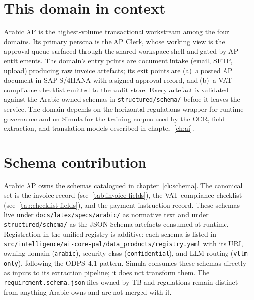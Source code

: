\documentclass[11pt,a4paper,twoside]{report}
\begin{document}
\section{This domain in context}
\label{sec:agent-domain-context}
Arabic AP is the highest-volume transactional workstream among the
four domains. Its primary persona is the AP Clerk, whose working view
is the approval queue surfaced through the shared workspace shell and
gated by AP entitlements. The domain's entry points are document
intake (email, SFTP, upload) producing raw invoice artefacts; its
exit points are (a)~a posted AP document in SAP S/4HANA with a signed
approval record, and (b)~a VAT compliance checklist emitted to the
audit store. Every artefact is validated against the Arabic-owned
schemas in \texttt{structured/schema/} before it leaves the service.
The domain depends on the horizontal regulations wrapper for runtime
governance and on Simula for the training corpus used by the OCR,
field-extraction, and translation models described in
chapter~\ref{ch:ai}.

\section{Schema contribution}
\label{sec:agent-schema-contrib}
Arabic AP owns the schemas catalogued in chapter~\ref{ch:schema}. The
canonical set is the invoice record (see~\ref{tab:invoice-fields}),
the VAT compliance checklist (see~\ref{tab:checklist-fields}), and the
payment instruction record. These schemas live under
\texttt{docs/latex/specs/arabic/} as normative text and under
\texttt{structured/schema/} as the JSON Schema artefacts consumed at
runtime. Registration in the unified registry is additive: each
schema is listed in
\texttt{src/intelligence/ai-core-pal/data\_products/registry.yaml}
with its URI, owning domain (\texttt{arabic}), security class
(\texttt{confidential}), and LLM routing
(\texttt{vllm-only}), following the ODPS~4.1 pattern. Simula consumes
these schemas directly as inputs to its extraction pipeline; it does
not transform them. The \texttt{requirement.schema.json} files owned
by TB and regulations remain distinct from anything Arabic owns and
are not merged with it.
\end{document}
